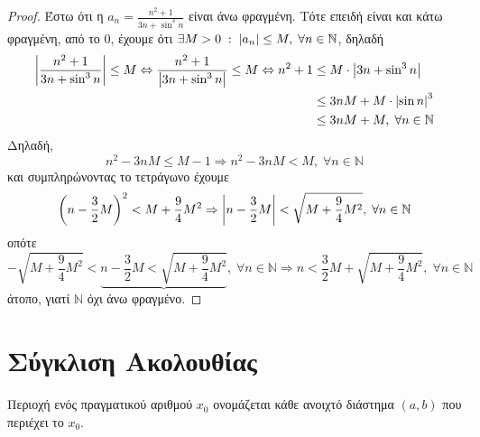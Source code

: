 \begin{examples}
\begin{enumerate}[i)]
      \begin{proof}
      \item {}
        Έστω ότι η $ a_{n} = \frac{n^{2}+1}{3n+ \sin^{3}{n}} $ είναι άνω 
        φραγμένη. Τότε επειδή είναι και κάτω φραγμένη, από το 0, έχουμε ότι
        $ \exists M>0 \; : \; \abs{a_{n}} \leq M, \; \forall n \in 
        \mathbb{N} $, δηλαδή
        \begin{align*}
          \abs{\frac{n^{2}+1}{3n + \sin^{3}{n}}} \leq M \Leftrightarrow 
          \frac{n^{2}+1}{\abs{3n + \sin^{3}{n}}} \leq M \Leftrightarrow 
          n^{2}+1
               &\leq M \cdot \abs{3n + \sin^{3}{n}} \\ 
               &\leq 3nM + M \cdot \abs{\sin{n}} ^{3} \\
               &\leq 3n M +M, \; \forall n \in \mathbb{N}
        \end{align*} 
        Δηλαδή, 
        \[
          n^{2}-3nM \leq M-1 \Rightarrow n^{2}-3nM < M, \; \forall n \in 
          \mathbb{N}
        \] 
        και συμπληρώνοντας το τετράγωνο έχουμε
        \[
          \left(n - \frac{3}{2} M\right)^{2} < M + \frac{9}{4} M^{2}
          \Rightarrow \abs{n - \frac{3}{2} M} < 
          \sqrt{M + \frac{9}{4} M^{2}}, \; \forall n \in \mathbb{N}
        \]
        οπότε
        \[
          - \sqrt{M + \frac{9}{4} M^{2}}< \underbrace{n- \frac{3}{2} M 
          < \sqrt{M + \frac{9}{4} M^{2}}}, \; \forall n \in \mathbb{N} 
          \Rightarrow n < \frac{3}{2} M + \sqrt{M + \frac{9}{4} M^{2}}, 
          \; \forall n \in \mathbb{N} 
        \] 
        άτοπο, γιατί $ \mathbb{N} $ όχι άνω φραγμένο.
      \end{proof}
  \end{enumerate}
\end{examples}


\section{Σύγκλιση Ακολουθίας}

\begin{mybox1}
  \begin{dfn}
    \textcolor{Col1}{Περιοχή} ενός πραγματικού αριθμού $ x_{0} $ 
    ονομάζεται κάθε ανοιχτό διάστημα $(a,b)$ που περιέχει το $ x_{0} $. 
  \end{dfn}
\end{mybox1}

